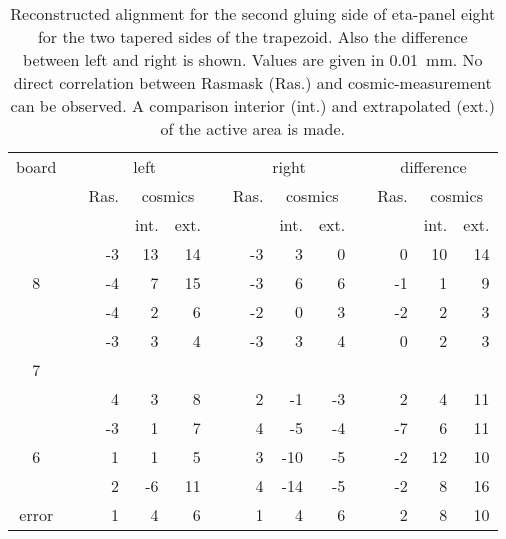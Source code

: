 \documentclass[
twoside,            %
BCOR1.4cm,          %
10pt,               %
headings=normal,    %
headsepline,        %
clearplainpage,		%
final,              %
div=14,
open=right,
bibliography=toc
]{scrreprt}
\begin{document}
\begin{table}[!h]
	\centering	
	\begin{tabular}{ccrrrcrrrcrrr}
		\hline
		\hline
		board & \hspace{1mm} & \multicolumn{3}{c}{left} & \hspace{1mm} & \multicolumn{3}{c}{right} & \hspace{1mm} & \multicolumn{3}{c}{difference}
		\\
		 & & Ras. & \multicolumn{2}{c}{cosmics} & & Ras. & \multicolumn{2}{c}{cosmics} & & Ras. & \multicolumn{2}{c}{cosmics}
		\\
	 	 & &       & int. & ext. & &      & int. & ext. & &      & int. & ext.
 		\\
		\hline
		  & &   -3 &   13 &   14 & &   -3 &    3 &    0 & &    0 &   10 &   14
		\\
		8 & &   -4 &    7 &   15 & &   -3 &    6 &    6 & &   -1 &    1 &    9
		\\
		  & &   -4 &    2 &    6 & &   -2 &    0 &    3 & &   -2 &    2 &    3
		\\
		\hline
		  & &   -3 &    3 &    4 & &   -3 &    3 &    4 & &    0 &    2 &    3
		\\
		7 & &      &      &      & &      &      &      & &      &      &     
		\\
		  & &    4 &    3 &    8 & &    2 &   -1 &   -3 & &    2 &    4 &   11
		\\
		\hline
		  & &   -3 &    1 &    7 & &    4 &   -5 &   -4 & &   -7 &    6 &   11
		\\
		6 & &    1 &    1 &    5 & &    3 &  -10 &   -5 & &   -2 &   12 &   10
		\\
		  & &    2 &   -6 &   11 & &    4 &  -14 &   -5 & &   -2 &    8 &   16
 		\\
	 	\hline
	 	error & & 1 & 4 & 6 & & 1 & 4 & 6 & & 2 & 8 & 10
 		\\
	 	\hline
		\hline
	\end{tabular}
	\caption{
		Reconstructed alignment for the second gluing side of eta-panel eight for the two tapered sides of the trapezoid.
		Also the difference between left and right is shown.
		Values are given in \SI{0.01}{mm}.
		No direct correlation between Rasmask (Ras.) and cosmic-measurement can be observed.
		A comparison interior (int.) and extrapolated (ext.) of the active area is made.
	}
	\label{eta8gs2alignment}
	\vspace{-5mm}
\end{table}
\end{document}
